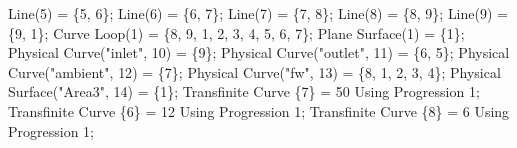 \documentclass[11pt]{article}
\newenvironment{Shaded}{}{}
\newcommand{\DecValTok}[1]{\textcolor[rgb]{0.25,0.63,0.44}{{#1}}}
\newcommand{\StringTok}[1]{\textcolor[rgb]{0.25,0.44,0.63}{{#1}}}
\newcommand{\NormalTok}[1]{{#1}}
\newcommand{\OperatorTok}[1]{\textcolor[rgb]{0.40,0.40,0.40}{{#1}}}
\begin{document}
\begin{Shaded}
\begin{Highlighting}[]
\NormalTok{Line}\OperatorTok{(}\DecValTok{5}\OperatorTok{)} \OperatorTok{=} \OperatorTok{\{}\DecValTok{5}\OperatorTok{,} \DecValTok{6}\OperatorTok{\};}
\NormalTok{Line}\OperatorTok{(}\DecValTok{6}\OperatorTok{)} \OperatorTok{=} \OperatorTok{\{}\DecValTok{6}\OperatorTok{,} \DecValTok{7}\OperatorTok{\};}
\NormalTok{Line}\OperatorTok{(}\DecValTok{7}\OperatorTok{)} \OperatorTok{=} \OperatorTok{\{}\DecValTok{7}\OperatorTok{,} \DecValTok{8}\OperatorTok{\};}
\NormalTok{Line}\OperatorTok{(}\DecValTok{8}\OperatorTok{)} \OperatorTok{=} \OperatorTok{\{}\DecValTok{8}\OperatorTok{,} \DecValTok{9}\OperatorTok{\};}
\NormalTok{Line}\OperatorTok{(}\DecValTok{9}\OperatorTok{)} \OperatorTok{=} \OperatorTok{\{}\DecValTok{9}\OperatorTok{,} \DecValTok{1}\OperatorTok{\};}
\NormalTok{Curve Loop}\OperatorTok{(}\DecValTok{1}\OperatorTok{)} \OperatorTok{=} \OperatorTok{\{}\DecValTok{8}\OperatorTok{,} \DecValTok{9}\OperatorTok{,} \DecValTok{1}\OperatorTok{,} \DecValTok{2}\OperatorTok{,} \DecValTok{3}\OperatorTok{,} \DecValTok{4}\OperatorTok{,} \DecValTok{5}\OperatorTok{,} \DecValTok{6}\OperatorTok{,} \DecValTok{7}\OperatorTok{\};}
\NormalTok{Plane Surface}\OperatorTok{(}\DecValTok{1}\OperatorTok{)} \OperatorTok{=} \OperatorTok{\{}\DecValTok{1}\OperatorTok{\};}
\NormalTok{Physical Curve}\OperatorTok{(}\StringTok{"inlet"}\OperatorTok{,} \DecValTok{10}\OperatorTok{)} \OperatorTok{=} \OperatorTok{\{}\DecValTok{9}\OperatorTok{\};}
\NormalTok{Physical Curve}\OperatorTok{(}\StringTok{"outlet"}\OperatorTok{,} \DecValTok{11}\OperatorTok{)} \OperatorTok{=} \OperatorTok{\{}\DecValTok{6}\OperatorTok{,} \DecValTok{5}\OperatorTok{\};}
\NormalTok{Physical Curve}\OperatorTok{(}\StringTok{"ambient"}\OperatorTok{,} \DecValTok{12}\OperatorTok{)} \OperatorTok{=} \OperatorTok{\{}\DecValTok{7}\OperatorTok{\};}
\NormalTok{Physical Curve}\OperatorTok{(}\StringTok{"fw"}\OperatorTok{,} \DecValTok{13}\OperatorTok{)} \OperatorTok{=} \OperatorTok{\{}\DecValTok{8}\OperatorTok{,} \DecValTok{1}\OperatorTok{,} \DecValTok{2}\OperatorTok{,} \DecValTok{3}\OperatorTok{,} \DecValTok{4}\OperatorTok{\};}
\NormalTok{Physical Surface}\OperatorTok{(}\StringTok{"Area3"}\OperatorTok{,} \DecValTok{14}\OperatorTok{)} \OperatorTok{=} \OperatorTok{\{}\DecValTok{1}\OperatorTok{\};}
\NormalTok{Transfinite Curve }\OperatorTok{\{}\DecValTok{7}\OperatorTok{\}} \OperatorTok{=} \DecValTok{50}\NormalTok{ Using Progression }\DecValTok{1}\OperatorTok{;}
\NormalTok{Transfinite Curve }\OperatorTok{\{}\DecValTok{6}\OperatorTok{\}} \OperatorTok{=} \DecValTok{12}\NormalTok{ Using Progression }\DecValTok{1}\OperatorTok{;}
\NormalTok{Transfinite Curve }\OperatorTok{\{}\DecValTok{8}\OperatorTok{\}} \OperatorTok{=} \DecValTok{6}\NormalTok{ Using Progression }\DecValTok{1}\OperatorTok{;}

\end{Highlighting}
\end{Shaded}
\end{document}
